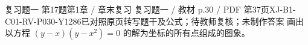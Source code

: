 \par\noindent\begin{minipage}{\linewidth}
\begin{bankitem}{复习题一 第17题}{第1章 / 章末复习 复习题一 / 教材 p.30 / PDF 第37页}{XJ-B1-C01-RV-P030-Y1286}{已对照原页转写题干及公式；待教师复核；未制作答案}
画出以方程 $(y-x)(y-x^2)=0$ 的解为坐标的所有点组成的图象。
\end{bankitem}
\end{minipage}\par\medskip
